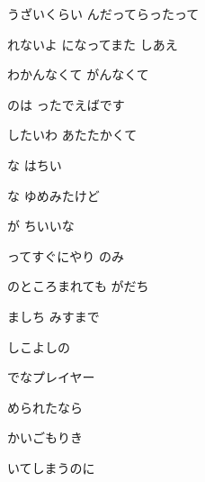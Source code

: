\documentclass[a4paper,tate,twocolumn,12pt]{ltjtarticle}
\begin{document}
\begin{flushleft}
\noindent\begin{minipage}{\linewidth}
うざいくらい んだってらったって

れないよ になってまた しあえ

わかんなくて がんなくて

のは ったでえばです
\end{minipage}

\vspace{2em}

\noindent\begin{minipage}{\linewidth}
したいわ あたたかくて

な はちい

な ゆめみたけど

が ちいいな
\end{minipage}

\vspace{3em}

\noindent\begin{minipage}{\linewidth}
ってすぐにやり のみ

のところまれても がだち

ましち みすまで

しこよしの
\end{minipage}

\vspace{2em}

\noindent\begin{minipage}{\linewidth}
でなプレイヤー

められたなら

かいごもりき

 いてしまうのに
\end{minipage}


\end{flushleft}
\end{document}
